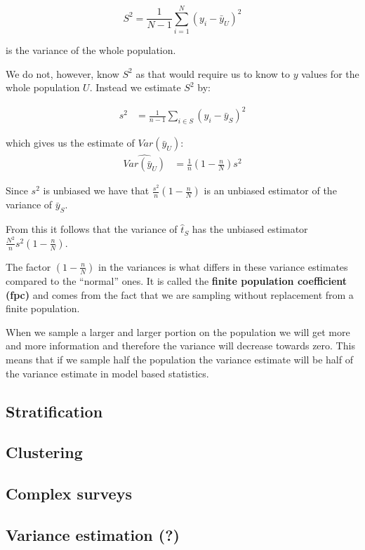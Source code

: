 \documentclass{article}
\begin{document}
\begin{equation*}
S^2 = \frac{1}{N - 1} \sum_{i = 1}^N (y_i - \bar{y}_U)^2
\end{equation*}

is the variance of the whole population.

We do not, however, know \(S^2\) as that would require us to know to \(y\) values
for the whole population \(U\). Instead we estimate \(S^2\) by:

\begin{align*}
  s^2
  &= \frac{1}{n - 1} \sum_{i \in S} \left( y_i - \bar{y}_S \right)^2
\end{align*}

which gives us the estimate of \(Var(\bar{y}_U)\):
\begin{align*}
  \widehat{Var(\bar{y}_U)}
  &= \frac{1}{n} \left( 1 - \frac{n}{N} \right) s^2
\end{align*}

Since \(s^2\) is unbiased we have that \(\frac{s^2}{n} \left( 1 - \frac{n}{N}
\right)\) is an unbiased estimator of the variance of \(\bar{y}_S\).

From this it follows that the variance of \(\hat{t}_S\) has the unbiased estimator
\(\frac{N^2}{n} s^2 \left( 1 - \frac{n}{N} \right)\).

The factor \(\left( 1 - \frac{n}{N} \right)\) in the variances is what differs in
these variance estimates compared to the ``normal'' ones. It is called the
\textbf{finite population coefficient (fpc)} and comes from the fact that we are
sampling without replacement from a finite population.

When we sample a larger and larger portion on the population we will get more
and more information and therefore the variance will decrease towards zero. This
means that if we sample half the population the variance estimate will be half
of the variance estimate in model based statistics.


\subsection{Stratification}

\subsection{Clustering}

\subsection{Complex surveys}

\subsection{Variance estimation (?)}
\end{document}
